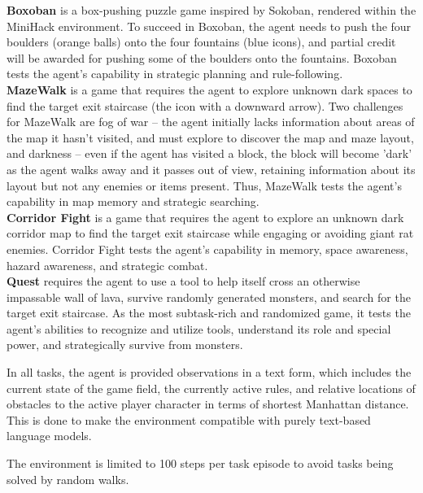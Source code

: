 \textbf{Boxoban} is a box-pushing puzzle game inspired by Sokoban, rendered within
the MiniHack environment. To succeed in Boxoban, the agent needs to push the four
boulders (orange balls) onto the four fountains (blue icons), and partial credit
will be awarded for pushing some of the boulders onto the fountains. Boxoban tests
the agent's capability in strategic planning and rule-following.
\newline
\\ \textbf{MazeWalk} is a game that requires the agent to explore unknown dark spaces
to find the target exit staircase (the icon with a downward arrow). Two
challenges for MazeWalk are fog of war -- the agent initially lacks information about
areas of the map it hasn't visited, and must explore to discover the map and
maze layout, and darkness -- even if the agent has visited a block, the block will
become 'dark' as the agent walks away and it passes out of view, retaining
information about its layout but not any enemies or items present. Thus,
MazeWalk tests the agent's capability in map memory and strategic searching.
\newline
\\ \textbf{Corridor Fight} is a game that requires the agent to explore an
unknown dark corridor map to find the target exit staircase while engaging or
avoiding giant rat enemies. Corridor Fight tests the agent's capability in memory,
space awareness, hazard awareness, and strategic combat.
\newline
\\ \textbf{Quest} requires the agent to use a tool to help itself cross an
otherwise impassable wall of lava, survive randomly generated monsters, and
search for the target exit staircase. As the most subtask-rich and randomized game,
it tests the agent's abilities to recognize and utilize tools, understand its role
and special power, and strategically survive from monsters.

In all tasks, the agent is provided observations in a text form, which includes
the current state of the game field, the currently active rules, and relative
locations of obstacles to the active player character in terms of shortest
Manhattan distance. This is done to make the environment compatible with purely text-based
language models.

The environment is limited to 100 steps per task episode to avoid tasks being solved
by random walks.